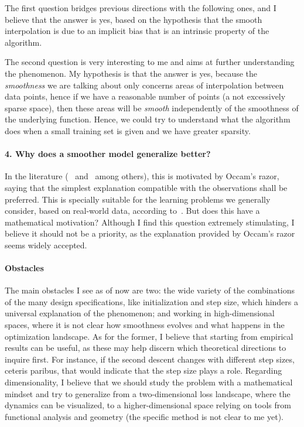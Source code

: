 \documentclass{amsart}
\begin{document}
The first question bridges previous directions with the following ones, and I believe that the answer is yes, based on the hypothesis that the smooth interpolation is due to an implicit bias that is an intrinsic property of the algorithm.

The second question is very interesting to me and aims at further understanding the phenomenon. My hypothesis is that the answer is yes, because the \textit{smoothness} we are talking about only concerns areas of interpolation between data points, hence if we have a reasonable number of points (a not excessively sparse space), then these areas will be \textit{smooth} independently of the smoothness of the underlying function. Hence, we could try to understand what the algorithm does when a small training set is given and we have greater sparsity.


\paragraph{4. Why does a smoother model generalize better?} 

In the literature (~\cite{belkin} and~\cite{prince} among others), this is motivated by Occam's razor, saying that the simplest explanation compatible with the observations shall be preferred. This is specially suitable for the learning problems we generally consider, based on real-world data, according to~\cite{belkin}. But does this have a mathematical motivation?
Although I find this question extremely stimulating, I believe it should not be a priority, as the explanation provided by Occam's razor seems widely accepted.

\paragraph{Obstacles} The main obstacles I see as of now are two: the wide variety of the combinations of the many design specifications, like initialization and step size, which hinders a universal explanation of the phenomenon; and working in high-dimensional spaces, where it is not clear how smoothness evolves and what happens in the optimization landscape. As for the former, I believe that starting from empirical results can be useful, as these may help discern which theoretical directions to inquire first. For instance, if the second descent changes with different step sizes, ceteris paribus, that would indicate that the step size plays a role. Regarding dimensionality, I believe that we should study the problem with a mathematical mindset and try to generalize from a two-dimensional loss landscape, where the dynamics can be visualized, to a higher-dimensional space relying on tools from functional analysis and geometry (the specific method is not clear to me yet). 
\end{document}
